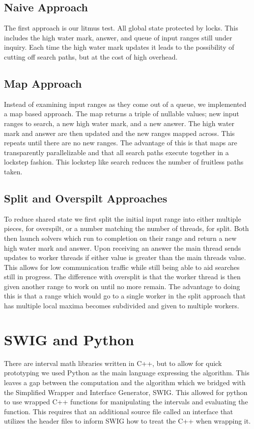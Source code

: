 \documentclass{acm_proc_article-sp}
\begin{document}
\subsection{Naive Approach}
The first approach is our litmus test. All global state protected by locks. This includes the high water mark, answer, and queue of input ranges still under inquiry. Each time the high water mark updates it leads to the possibility of cutting off search paths, but at the cost of high overhead.

\subsection{Map Approach}
Instead of examining input ranges as they come out of a queue, we implemented a map based approach. The map returns a triple of nullable values; new input ranges to search, a new high water mark, and a new answer. The high water mark and answer are then updated and the new ranges mapped across. This repeats until there are no new ranges. The advantage of this is that maps are transparently parallelizable and that all search paths execute together in a lockstep fashion. This lockstep like search reduces the number of fruitless paths taken.

\subsection{Split and Overspilt Approaches}
To reduce shared state we first split the initial input range into either multiple pieces, for overspilt, or a number matching the number of threads, for split. Both then launch solvers which run to completion on their range and return a new high water mark and answer. Upon receiving an answer the main thread sends updates to worker threads if either value is greater than the main threads value. This allows for low communication traffic while still being able to aid searches still in progress. The difference with oversplit is that the worker thread is then given another range to work on until no more remain. The advantage to doing this is that a range which would go to a single worker in the split approach that has multiple local maxima becomes subdivided and given to multiple workers.  

\balancecolumns

\section{SWIG and Python}
There are interval math libraries written in C++, but to allow for quick prototyping we used Python as the main language expressing the algorithm. This leaves a gap between the computation and the algorithm which we bridged with the Simplified Wrapper and Interface Generator, SWIG\@. This allowed for python to use wrapped C++ functions for manipulating the intervals and evaluating the function. This requires that an additional source file called an interface that utilizes the header files to inform SWIG how to treat the C++ when wrapping it.
\end{document}
